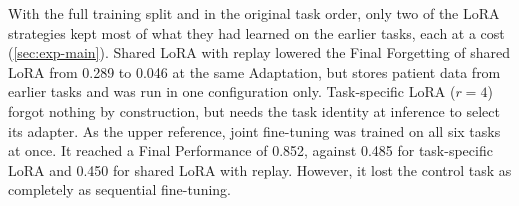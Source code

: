 

With the full training split and in the original task order, only two of the LoRA strategies kept most of what they had learned on the earlier tasks, each at a cost (\cref{sec:exp-main}).
Shared LoRA with replay lowered the Final Forgetting of shared LoRA from 0.289 to 0.046 at the same Adaptation, but stores patient data from earlier tasks and was run in one configuration only.
Task-specific LoRA ($r = 4$) forgot nothing by construction, but needs the task identity at inference to select its adapter.
As the upper reference, joint fine-tuning was trained on all six tasks at once.
It reached a Final Performance of 0.852, against 0.485 for task-specific LoRA and 0.450 for shared LoRA with replay.
However, it lost the control task as completely as sequential fine-tuning.

